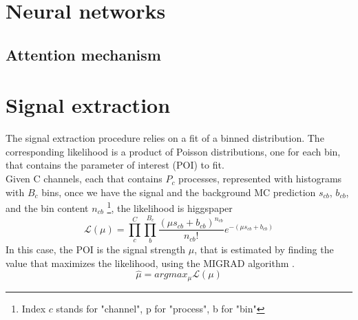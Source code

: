 \label{sec:STAT}
\minitoc
\section{Neural networks}
\subsection{Attention mechanism}

\section{Signal extraction}
The signal extraction procedure relies on a fit of a binned distribution.
The corresponding likelihood is a product of Poisson distributions, one for each bin, that contains the parameter of interest (POI) to fit.\\
Given C channels, each that contains $P_c$ processes, represented with histograms with $B_c$ bins, once we have the signal and the background MC prediction $s_{cb}$, $b_{cb}$, and the bin content $n_{cb}$ \footnote{Index $c$ stands for "channel", p for "process", b for "bin"}, the likelihood is \ADDREF higgspaper
\begin{equation}
    \mathcal{L}(\mu)=\prod_c^C \prod_b^{B_c} \frac{(\mu s_{cb}+b_{cb})^{n_{cb}}}{n_{cb}!} e^{-(\mu s_{cb}+b_{cb})}
\end{equation}
In this case, the POI is the signal strength $\mu$, that is estimated by finding the value that maximizes the likelihood, using the MIGRAD algorithm \ADDREF.
\begin{equation*}
    \hat{\mu}=argmax_\mu \mathcal{L}(\mu)
\end{equation*}


